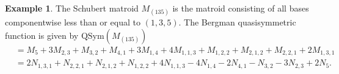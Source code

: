 \documentclass[12pt,reqno]{amsart}
\numberwithin{definition}{section}
\theoremstyle{definition}
\newtheorem{example}[definition]{Example}
\newcommand{\comment}[1]{\textsf{\footnotesize #1}}
\begin{document}
\begin{example}




The Schubert matroid $M_{(135)}$ is the matroid consisting of 
all bases componentwise less than or equal to $(1,3,5)$.  The Bergman quasisymmetric function is given by $ \textrm{QSym}(M_{(135)})$ 
\begin{align*}
&  =  M_5 + 3M_{2,3} + M_{3,2} + M_{4,1} + 3M_{1,4}  + 4M_{1,1,3} + M_{1,2,2} + M_{2,1,2} + M_{2,2,1} + 2M_{1,3,1}\\
&  =  2N_{1,3,1} + N_{2,2,1} + N_{2,1,2} + N_{1,2,2} + 4N_{1,1,3}  - 4 N_{1,4} - 2N_{4,1} - N_{3,2} - 3N_{2,3} + 2N_5.
\end{align*}

\end{example}







\end{document}
